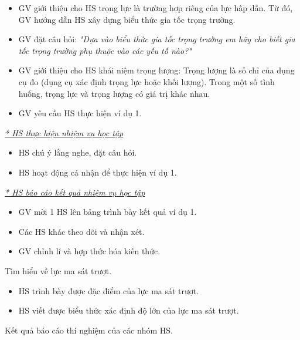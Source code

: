 {\begin{itemize}[label=-]
\begin{itemize}[label=$\bullet$]
		\end{itemize}
		\item GV giới thiệu cho HS trọng lực là trường hợp riêng của lực hấp dẫn. Từ đó, GV hướng dẫn HS xây dựng biểu thức gia tốc trọng trường.
		\item GV đặt câu hỏi: \textit{"Dựa vào biểu thức gia tốc trọng trường em hãy cho biết gia tốc trọng trường phụ thuộc vào các yếu tố nào?"}
		\item GV giới thiệu cho HS khái niệm trọng lượng: Trọng lượng là số chỉ của dụng cụ đo (dụng cụ xác định trọng lực hoặc khối lượng). Trong một số tình huống, trọng lực và trọng lượng có giá trị khác nhau.
		\item GV yêu cầu HS thực hiện ví dụ 1.
	\end{itemize}
		\textit{\underline{* HS thực hiện nhiệm vụ học tập}}
	\begin{itemize}[label=-]
		\item HS chú ý lắng nghe, đặt câu hỏi.
		\item HS hoạt động cá nhận để thực hiện ví dụ 1.
	\end{itemize}
	\textit{\underline{* HS báo cáo kết quả nhiệm vụ học tập}}
	\begin{itemize}[label=-]
		\item GV mời 1 HS lên bảng trình bày kết quả ví dụ 1.
		\item Các HS khác theo dõi và nhận xét.
		\item GV chỉnh lí và hợp thức hóa kiến thức.
	\end{itemize}
}
\hoatdong
{Tìm hiểu về lực ma sát trượt.
}
{\begin{itemize}
		\item HS trình bày được đặc điểm của lực ma sát trượt.
		\item HS viết được biểu thức xác định độ lớn của lực ma sát trượt.
	\end{itemize}
}
{Kết quả báo cáo thí nghiệm của các nhóm HS.
}
